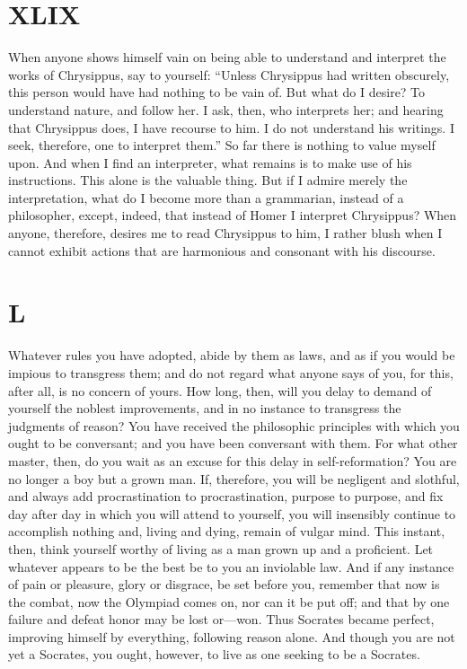 \documentclass[11pt]{article}
\begin{document}
\section*{XLIX}

When anyone shows himself vain on being able to understand and interpret the works of Chrysippus, say to yourself: “Unless Chrysippus had written obscurely, this person would have had nothing to be vain of. But what do I desire? To understand nature, and follow her. I ask, then, who interprets her; and hearing that Chrysippus does, I have recourse to him. I do not understand his writings. I seek, therefore, one to interpret them.” So far there is nothing to value myself upon. And when I find an interpreter, what remains is to make use of his instructions. This alone is the valuable thing. But if I admire merely the interpretation, what do I become more than a grammarian, instead of a philosopher, except, indeed, that instead of Homer I interpret Chrysippus? When anyone, therefore, desires me to read Chrysippus to him, I rather blush when I cannot exhibit actions that are harmonious and consonant with his discourse.
\section*{L}

Whatever rules you have adopted, abide by them as laws, and as if you would be impious to transgress them; and do not regard what anyone says of you, for this, after all, is no concern of yours. How long, then, will you delay to demand of yourself the noblest improvements, and in no instance to transgress the judgments of reason? You have received the philosophic principles with which you ought to be conversant; and you have been conversant with them. For what other master, then, do you wait as an excuse for this delay in self-reformation? You are no longer a boy but a grown man. If, therefore, you will be negligent and slothful, and always add procrastination to procrastination, purpose to purpose, and fix day after day in which you will attend to yourself, you will insensibly continue to accomplish nothing and, living and dying, remain of vulgar mind. This instant, then, think yourself worthy of living as a man grown up and a proficient. Let whatever appears to be the best be to you an inviolable law. And if any instance of pain or pleasure, glory or disgrace, be set before you, remember that now is the combat, now the Olympiad comes on, nor can it be put off; and that by one failure and defeat honor may be lost or—won. Thus Socrates became perfect, improving himself by everything, following reason alone. And though you are not yet a Socrates, you ought, however, to live as one seeking to be a Socrates.
\end{document}
